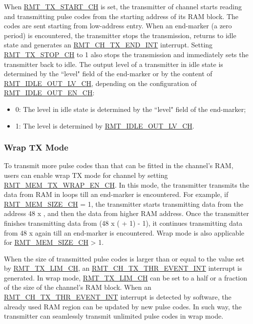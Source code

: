 \documentclass[main\_\_EN.tex]{subfiles}
\begin{document}
When \hyperref[fielddesc:RMTTXSTARTCHN]{RMT\_TX\_START\_CH} is set, the transmitter of channel  starts reading and transmitting pulse codes from the starting address of its RAM block. The codes are sent starting from low-address entry. When an end-marker (a zero period) is encountered, the transmitter stops the transmission, returns to idle state and generates an \hyperref[int:RMTCHNTXENDINT]{RMT\_CH\_TX\_END\_INT} interrupt. Setting \hyperref[fielddesc:RMTTXSTOPCHN]{RMT\_TX\_STOP\_CH} to 1 also stops the transmission and immediately sets the transmitter back to idle. The output level of a transmitter in idle state is determined by the ``level" field of the end-marker or by the content of \hyperref[fielddesc:RMTIDLEOUTLVCHN]{RMT\_IDLE\_OUT\_LV\_CH}, depending on the configuration of  \hyperref[fielddesc:RMTIDLEOUTENCHN]{RMT\_IDLE\_OUT\_EN\_CH}:

\begin{itemize}
    \item 0: The level in idle state is determined by the ``level" field of the end-marker;
    \item 1: The level is determined by \hyperref[fielddesc:RMTIDLEOUTLVCHN]{RMT\_IDLE\_OUT\_LV\_CH}.
\end{itemize}

\subsubsection{Wrap TX Mode}\label{sec:wrap-tx-mode}

To transmit more pulse codes than that can be fitted in the channel's RAM, users can enable wrap TX mode for channel  by setting \hyperref[fielddesc:RMTMEMTXWRAPENCHN]{RMT\_MEM\_TX\_WRAP\_EN\_CH}. In this mode, the transmitter transmits the data from RAM in loops till an end-marker is encountered.
For example, if \hyperref[fielddesc:RMTMEMSIZECHN]{RMT\_MEM\_SIZE\_CH} = 1, the transmitter starts transmitting data from the address 48 x , and then the data from higher RAM address. Once the transmitter finishes transmitting data from (48 x ( + 1) - 1), it continues transmitting data from 48 x  again till an end-marker is encountered. Wrap mode is also applicable for \hyperref[fielddesc:RMTMEMSIZECHN]{RMT\_MEM\_SIZE\_CH} > 1.

When the size of transmitted pulse codes is larger than or equal to the value set by \hyperref[fielddesc:RMTTXLIMCHN]{RMT\_TX\_LIM\_CH}, an  \hyperref[int:RMTCHNTXTHREVENTINT]{RMT\_CH\_TX\_THR\_EVENT\_INT} interrupt is generated. In wrap mode,  \hyperref[fielddesc:RMTTXLIMCHN]{RMT\_TX\_LIM\_CH} can be set to a half or a fraction of the size of the channel's RAM block. When an  \hyperref[int:RMTCHNTXTHREVENTINT]{RMT\_CH\_TX\_THR\_EVENT\_INT} interrupt is detected by software, the already used RAM region can be updated by new pulse codes. In such way, the transmitter can seamlessly transmit unlimited pulse codes in wrap mode.
\end{document}
